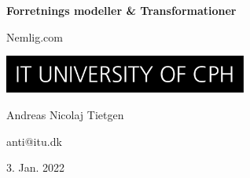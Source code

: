 \documentclass[11pt]{article}
\begin{document}
\begin{titlepage}
    \begin{center}
        \huge
        \textbf{Forretnings modeller \& Transformationer}

        \vspace{0.5cm}
        Nemlig.com

        \vspace{3cm}
        \includegraphics[width=0.6\textwidth]{itu.jpeg}

        \vspace{3cm}
        \large
        Andreas Nicolaj Tietgen 
        
        anti@itu.dk

        \vfill
        3. Jan. 2022
    \end{center}
\end{titlepage}

\newpage

\tableofcontents

\newpage




\newpage
\printbibliography

\newpage

\end{document}

